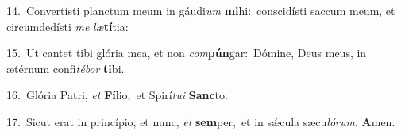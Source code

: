 {\numbfont\textcolor{\numbcolor}{14.}}~Convertísti planctum meum in gáudi\textit{um} \textbf{mi}\-hi:~\star conscidísti saccum meum, et circumdedísti \textit{me} \textit{læ}\-\textbf{tí}tia:\par
{\numbfont\textcolor{\numbcolor}{15.}}~Ut cantet tibi glória mea, et non \textit{com}\-\textbf{pún}gar:~\star Dómine, Deus meus, in ætérnum confi\-\textit{té}\-\textit{bor} \textbf{ti}\-bi.\par
{\numbfont\textcolor{\numbcolor}{16.}}~Glória Patri, \textit{et} \textbf{Fí}\-lio,~\star et Spirí\-\textit{tu}\-\textit{i} \textbf{Sanc}\-to.\par
{\numbfont\textcolor{\numbcolor}{17.}}~Sicut erat in princípio, et nunc, \textit{et} \textbf{sem}\-per,~\star et in sǽcula sæcu\-\textit{ló}\-\textit{rum}. \textbf{A}\-men.\par
